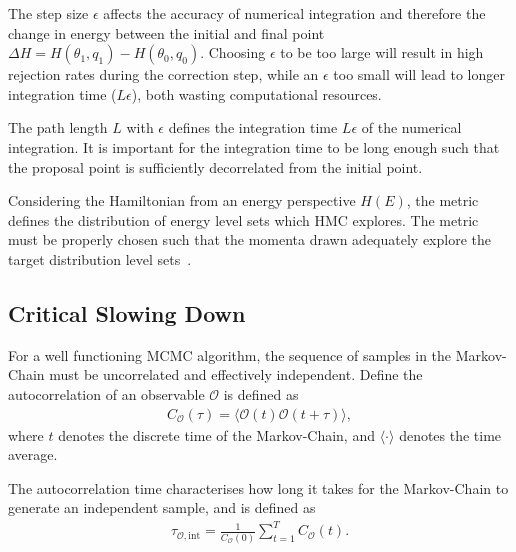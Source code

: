 \documentclass[11pt]{article}
\begin{document}
    The step size $\epsilon$ affects the accuracy of numerical integration and therefore the change in energy between the initial
    and final point $\Delta H = H(\theta_1, q_1) - H(\theta_0, q_0)$.
    Choosing $\epsilon$ to be too large will result in high rejection rates during the correction step,
    while an $\epsilon$ too small will lead to longer integration
    time ($L\epsilon$), both wasting computational resources.

    The path length $L$ with $\epsilon$ defines the integration time $L\epsilon$ of the numerical integration.
    It is important for the integration time to be long enough such that the proposal point is sufficiently decorrelated
    from the initial point.

    Considering the Hamiltonian from an energy perspective $H(E)$, the metric defines the distribution of energy level
    sets which HMC explores.
    The metric must be properly chosen such that the momenta drawn adequately explore the target distribution level
    sets~\cite{betancourt2016energymetric}.

\subsection{Critical Slowing Down}\label{subsec:critical_slowing}
    For a well functioning MCMC algorithm, the sequence of samples in the Markov-Chain must be uncorrelated and
    effectively independent.
    Define the autocorrelation of an observable $\mathcal{O}$ is defined as
    \begin{equation}\label{eq:autocorrelation}
    \begin{aligned}
        C_{\mathcal{O}}(\tau) = \langle \mathcal{O}(t) \mathcal{O}(t + \tau) \rangle,
    \end{aligned}
    \end{equation}
    where $t$ denotes the discrete time of the Markov-Chain, and $\langle \cdot \rangle$ denotes the time average.

    The autocorrelation time characterises how long it takes for the Markov-Chain to generate an independent sample,
    and is defined as
    \begin{equation}\label{eq:autocorrelation_time}
    \begin{aligned}
        \tau_{\mathcal{O}, \text{int}} = \frac{1}{C_{\mathcal{O}}(0)} \sum_{t=1}^T C_{\mathcal{O}}(t).
    \end{aligned}
    \end{equation}
\end{document}
